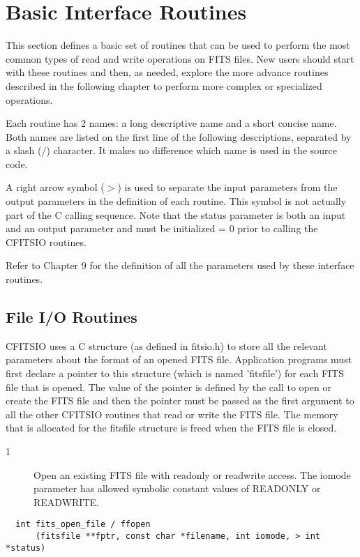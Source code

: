 \chapter{ Basic Interface Routines }

This section defines a basic set of routines that can be
used to perform the most common types of read and write operations
on FITS files.  New users should start with these routines and
then, as needed, explore the more advance routines described in
the following chapter to perform more complex or specialized operations.

Each routine has 2 names: a long descriptive
name and a short concise name.  Both names are listed on the first
line of the following descriptions, separated by a slash (/) character.
It makes no difference which name is used in the source code.

A right arrow symbol ($>$) is used to separate the input parameters from
the output parameters in the  definition of each routine.  This symbol
is not actually part of the C calling sequence.  Note that
the status parameter is both an input and an output parameter
and must be initialized = 0 prior to calling the CFITSIO routines.

Refer to Chapter 9 for the definition of all the parameters
used by these interface routines.


\section{File I/O Routines}

CFITSIO uses a C structure (as defined in fitsio.h) to store all the
relevant parameters about the format of an opened FITS file.
Application programs must first declare a pointer to this structure
(which is named 'fitsfile') for each FITS file that is opened.  The
value of the pointer is defined by the call to open or create the FITS
file and then the pointer must be passed as the first argument to all
the other CFITSIO routines that read or write the FITS file.  The
memory that is allocated for the fitsfile structure is freed when
the FITS file is closed.


\begin{description}
\item[1 ] Open an existing FITS file with readonly or readwrite access.
    The iomode parameter has allowed symbolic constant values of
   READONLY or READWRITE.
\end{description}

\begin{verbatim}
  int fits_open_file / ffopen
      (fitsfile **fptr, const char *filename, int iomode, > int *status)
\end{verbatim}

